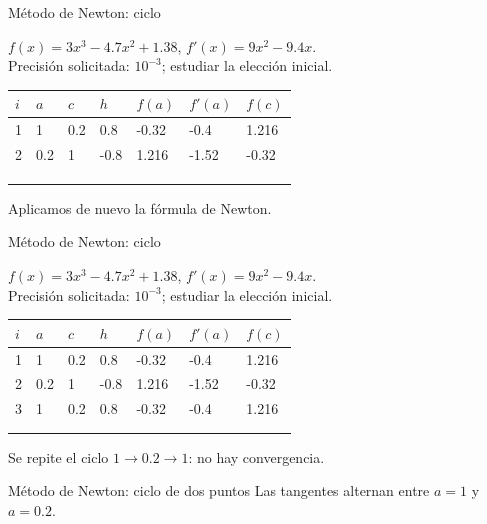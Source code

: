 \documentclass[main.tex]{subfiles}
\begin{document}
\begin{frame}[t]{Método de Newton: ciclo}
\begin{minipage}[t][17mm]{\textwidth}\small
$f(x)=3x^3-4.7x^2+1.38$, $f'(x)=9x^2-9.4x$.\\
Precisión solicitada: $10^{-3}$; estudiar la elección inicial.
\end{minipage}\begingroup\scriptsize\setlength{\tabcolsep}{2pt}
\begin{center}\begin{tabular}{|C{.04\textwidth}|*{6}{C{.135\textwidth}|}}\hline
$i$&$a$&$c$&$h$&$f(a)$&$f'(a)$&$f(c)$\\\hline
\rule{0pt}{5mm}1&1&0.2&0.8&-0.32&-0.4&1.216\\\hline
\rule{0pt}{5mm}2&0.2&1&-0.8&1.216&-1.52&-0.32\\\hline
\rule{0pt}{5mm}&&&&&&\\\hline
\rule{0pt}{5mm}&&&&&&\\\hline
\rule{0pt}{5mm}&&&&&&\\\hline
\end{tabular}\end{center}\endgroup\small Aplicamos de nuevo la fórmula de Newton.
\end{frame}
\begin{frame}[t]{Método de Newton: ciclo}
\begin{minipage}[t][17mm]{\textwidth}\small
$f(x)=3x^3-4.7x^2+1.38$, $f'(x)=9x^2-9.4x$.\\
Precisión solicitada: $10^{-3}$; estudiar la elección inicial.
\end{minipage}\begingroup\scriptsize\setlength{\tabcolsep}{2pt}
\begin{center}\begin{tabular}{|C{.04\textwidth}|*{6}{C{.135\textwidth}|}}\hline
$i$&$a$&$c$&$h$&$f(a)$&$f'(a)$&$f(c)$\\\hline
\rule{0pt}{5mm}1&1&0.2&0.8&-0.32&-0.4&1.216\\\hline
\rule{0pt}{5mm}2&0.2&1&-0.8&1.216&-1.52&-0.32\\\hline
\rule{0pt}{5mm}3&1&0.2&0.8&-0.32&-0.4&1.216\\\hline
\rule{0pt}{5mm}&&&&&&\\\hline
\rule{0pt}{5mm}&&&&&&\\\hline
\end{tabular}\end{center}\endgroup\small Se repite el ciclo $1\to0.2\to1$: no hay convergencia.
\end{frame}
\begin{frame}[t]{Método de Newton: ciclo de dos puntos}
Las tangentes alternan entre $a=1$ y $a=0.2$.
\end{frame}
\end{document}
